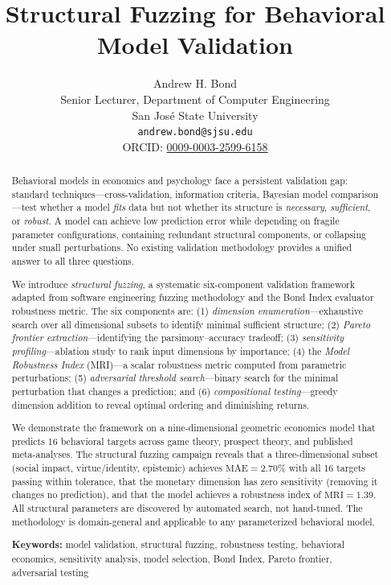 \documentclass[12pt]{article}
\title{\textbf{Structural Fuzzing for Behavioral Model Validation}}
\author{Andrew H. Bond\\
Senior Lecturer, Department of Computer Engineering\\
San Jos\'{e} State University\\
\texttt{andrew.bond@sjsu.edu}\\
ORCID: \href{https://orcid.org/0009-0003-2599-6158}{0009-0003-2599-6158}}
\date{}
\newcommand{\MAE}{\mathrm{MAE}}
\newcommand{\MRI}{\mathrm{MRI}}
\begin{document}
\maketitle

\begin{abstract}
Behavioral models in economics and psychology face a persistent validation gap: standard techniques---cross-validation, information criteria, Bayesian model comparison---test whether a model \emph{fits} data but not whether its structure is \emph{necessary}, \emph{sufficient}, or \emph{robust}.  A model can achieve low prediction error while depending on fragile parameter configurations, containing redundant structural components, or collapsing under small perturbations.  No existing validation methodology provides a unified answer to all three questions.

We introduce \emph{structural fuzzing}, a systematic six-component validation framework adapted from software engineering fuzzing methodology and the Bond Index evaluator robustness metric.  The six components are: (1) \emph{dimension enumeration}---exhaustive search over all dimensional subsets to identify minimal sufficient structure; (2) \emph{Pareto frontier extraction}---identifying the parsimony--accuracy tradeoff; (3) \emph{sensitivity profiling}---ablation study to rank input dimensions by importance; (4) the \emph{Model Robustness Index} (MRI)---a scalar robustness metric computed from parametric perturbations; (5) \emph{adversarial threshold search}---binary search for the minimal perturbation that changes a prediction; and (6) \emph{compositional testing}---greedy dimension addition to reveal optimal ordering and diminishing returns.

We demonstrate the framework on a nine-dimensional geometric economics model that predicts 16 behavioral targets across game theory, prospect theory, and published meta-analyses.  The structural fuzzing campaign reveals that a three-dimensional subset (social impact, virtue/identity, epistemic) achieves $\MAE = 2.70\%$ with all 16 targets passing within tolerance, that the monetary dimension has zero sensitivity (removing it changes no prediction), and that the model achieves a robustness index of $\MRI = 1.39$.  All structural parameters are discovered by automated search, not hand-tuned.  The methodology is domain-general and applicable to any parameterized behavioral model.

\medskip
\noindent\textbf{Keywords:} model validation, structural fuzzing, robustness testing, behavioral economics, sensitivity analysis, model selection, Bond Index, Pareto frontier, adversarial testing
\end{abstract}
\end{document}
